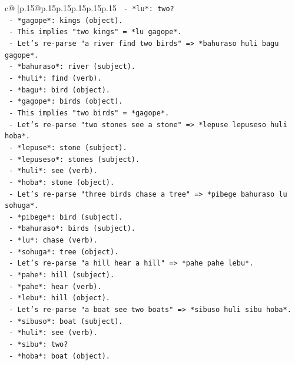 \documentclass{article}
\begin{document}
{\begin{supertabular}{c@{$\;$}|p{.15\linewidth}@{}p{.15\linewidth}p{.15\linewidth}p{.15\linewidth}p{.15\linewidth}p{.15\linewidth}}
{{{\texttt{      {-} *lu*: two?} \\
\texttt{      {-} *gagope*: kings (object).} \\
\texttt{      {-} This implies "two kings" = *lu gagope*.} \\
\texttt{    {-} Let's re{-}parse "a river find two birds" => *bahuraso huli bagu gagope*.} \\
\texttt{      {-} *bahuraso*: river (subject).} \\
\texttt{      {-} *huli*: find (verb).} \\
\texttt{      {-} *bagu*: bird (object).} \\
\texttt{      {-} *gagope*: birds (object).} \\
\texttt{      {-} This implies "two birds" = *gagope*.} \\
\texttt{    {-} Let's re{-}parse "two stones see a stone" => *lepuse lepuseso huli hoba*.} \\
\texttt{      {-} *lepuse*: stone (subject).} \\
\texttt{      {-} *lepuseso*: stones (subject).} \\
\texttt{      {-} *huli*: see (verb).} \\
\texttt{      {-} *hoba*: stone (object).} \\
\texttt{    {-} Let's re{-}parse "three birds chase a tree" => *pibege bahuraso lu sohuga*.} \\
\texttt{      {-} *pibege*: bird (subject).} \\
\texttt{      {-} *bahuraso*: birds (subject).} \\
\texttt{      {-} *lu*: chase (verb).} \\
\texttt{      {-} *sohuga*: tree (object).} \\
\texttt{    {-} Let's re{-}parse "a hill hear a hill" => *pahe pahe lebu*.} \\
\texttt{      {-} *pahe*: hill (subject).} \\
\texttt{      {-} *pahe*: hear (verb).} \\
\texttt{      {-} *lebu*: hill (object).} \\
\texttt{    {-} Let's re{-}parse "a boat see two boats" => *sibuso huli sibu hoba*.} \\
\texttt{      {-} *sibuso*: boat (subject).} \\
\texttt{      {-} *huli*: see (verb).} \\
\texttt{      {-} *sibu*: two?} \\
\texttt{      {-} *hoba*: boat (object).} \\
}}}
\end{supertabular}}
\end{document}
